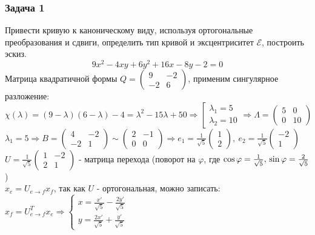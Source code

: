 \documentclass[12pt, letterpaper, twoside]{article}
\begin{document}
\subsubsection*{Задача 1}
Привести кривую к каноническому виду, используя ортогональные преобразования и сдвиги, определить тип кривой и эксцентриситет $\mathcal{E}$, построить эскиз.\\
\[9x^2 - 4xy + 6y^2 + 16x - 8y - 2 = 0\]
Матрица квадратичной формы $Q = \begin{pmatrix}
    9 & -2\\
    -2 & 6
\end{pmatrix}$, применим сингулярное разложение:
\[\chi(\lambda) = (9 -\lambda)(6 - \lambda) - 4 = \lambda^2 - 15\lambda + 50\Rightarrow \left[\begin{gathered}
    \lambda_1 = 5\\
    \lambda_2 = 10
\end{gathered} \right.\Rightarrow \Lambda = \begin{pmatrix}
    5 & 0\\
    0 & 10
\end{pmatrix}\]
$\lambda_1 = 5\Rightarrow B = \begin{pmatrix}
    4 & -2\\
    -2 & 1
\end{pmatrix} \sim \begin{pmatrix}
    2 & -1\\
    0 & 0
\end{pmatrix}\Rightarrow e_1 = \frac{1}{\sqrt{5}}\begin{pmatrix}
    1\\2
\end{pmatrix},\ e_2 = \frac{1}{\sqrt{5}}\begin{pmatrix}
    -2 \\ 1
\end{pmatrix}$\\
$U = \frac{1}{\sqrt{5}} \begin{pmatrix}
    1 & -2\\
    2 & 1
\end{pmatrix}$ - матрица перехода (поворот на $\varphi$, где $\cos \varphi = \frac{1}{\sqrt{5}},\\ \sin\varphi = \frac{2}{\sqrt{5}}$)\\
$x_e = U_{e\to f} x_f$, так как $U$ - ортогональная, можно записать:\\
$x_f = U_{e\to f}^T x_e\Rightarrow \begin{cases}
    x = \frac{x'}{\sqrt{5}} - \frac{2y'}{\sqrt{5}}\\
    y = \frac{2x'}{\sqrt{5}} + \frac{y'}{\sqrt{5}}
\end{cases}$\\
\end{document}
